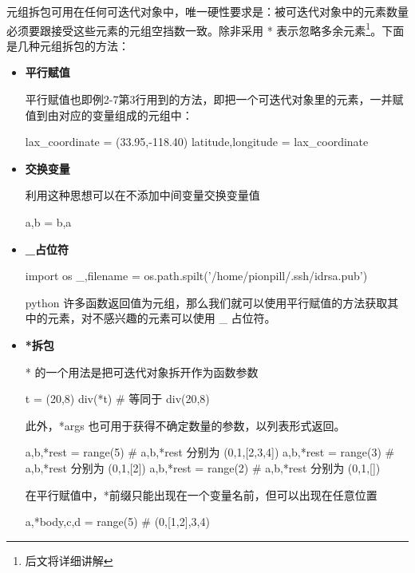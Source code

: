 元组拆包可用在任何可迭代对象中，唯一硬性要求是：被可迭代对象中的元素数量必须要跟接受这些元素的元组空挡数一致。除非采用 * 表示忽略多余元素\footnote{后文将详细讲解}。下面是几种元组拆包的方法：

\begin{itemize}
    \item \textbf{平行赋值}
    
    平行赋值也即例2-7第3行用到的方法，即把一个可迭代对象里的元素，一并赋值到由对应的变量组成的元组中：

    \begin{python}
lax_coordinate = (33.95,-118.40)
latitude,longitude = lax_coordinate
    \end{python}

    \item \textbf{交换变量}
    
    利用这种思想可以在不添加中间变量交换变量值

    \begin{python}
a,b = b,a
    \end{python}

    
    \item \textbf{\_占位符}
    
    \begin{python}
        import os
        _,filename = os.path.spilt('/home/pionpill/.ssh/idrsa.pub')
    \end{python}
    
    python 许多函数返回值为元组，那么我们就可以使用平行赋值的方法获取其中的元素，对不感兴趣的元素可以使用 \_ 占位符。
    
    \item \textbf{*拆包}

    * 的一个用法是把可迭代对象拆开作为函数参数

    \begin{python}
t = (20,8)
div(*t)     # 等同于 div(20,8)
    \end{python}

    此外，*args 也可用于获得不确定数量的参数，以列表形式返回。

    \begin{python}
a,b,*rest = range(5)    # a,b,*rest 分别为 (0,1,[2,3,4])
a,b,*rest = range(3)    # a,b,*rest 分别为 (0,1,[2])
a,b,*rest = range(2)    # a,b,*rest 分别为 (0,1,[])
    \end{python}

    在平行赋值中，*前缀只能出现在一个变量名前，但可以出现在任意位置

    \begin{python}
a,*body,c,d = range(5)  # (0,[1,2],3,4)
    \end{python}

\end{itemize}

